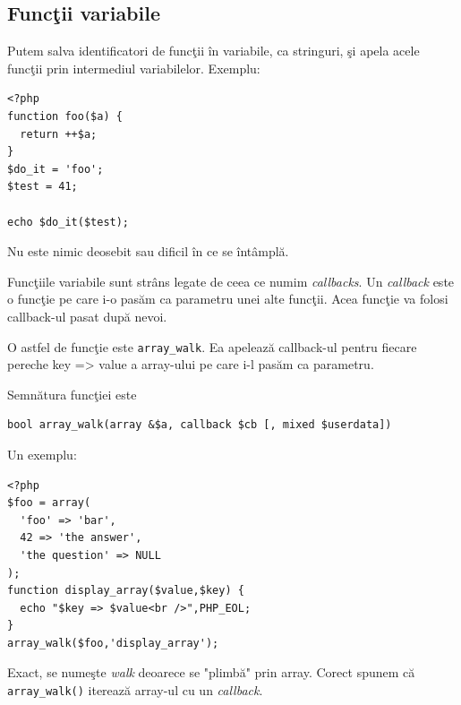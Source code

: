 

\subsection{Funcţii variabile}
Putem salva identificatori de funcţii în variabile, ca stringuri, şi apela 
acele funcţii prin intermediul variabilelor. Exemplu:
\begin{lstlisting}
<?php
function foo($a) {
  return ++$a;
}
$do_it = 'foo';
$test = 41;

echo $do_it($test);
\end{lstlisting}
Nu este nimic deosebit sau dificil în ce se întâmplă.


Funcţiile variabile sunt strâns legate de ceea ce numim \textsl{callbacks}.
Un \textit{callback} este o funcţie pe care i-o pasăm ca parametru
unei alte funcţii. Acea funcţie va folosi callback-ul pasat după nevoi.

O astfel de funcţie este \texttt{array\_walk}. Ea apelează callback-ul
pentru fiecare pereche key => value a array-ului pe care i-l pasăm ca parametru.

Semnătura funcţiei este
\begin{verbatim}
bool array_walk(array &$a, callback $cb [, mixed $userdata])
\end{verbatim}
Un exemplu:
\begin{lstlisting}
<?php
$foo = array(
  'foo' => 'bar',
  42 => 'the answer',
  'the question' => NULL
);
function display_array($value,$key) {
  echo "$key => $value<br />",PHP_EOL;
}
array_walk($foo,'display_array');
\end{lstlisting}
Exact, se numeşte \textit{walk} deoarece se "plimbă" prin array.
Corect spunem că \texttt{array\_walk()} iterează array-ul
cu un \textit{callback}.

